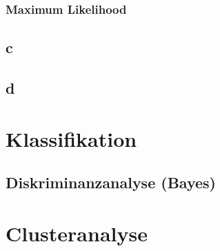 \documentclass[10pt]{article}
\begin{document}
\subsubsection{Maximum Likelihood}

\subsection{c}

\subsection{d}




\section{Klassifikation}

\subsection{Diskriminanzanalyse (Bayes)}

\section{Clusteranalyse}
\end{document}
